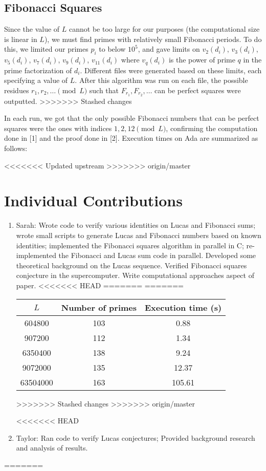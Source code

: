 \documentclass[11pt]{article}
\begin{document}
\subsection{Fibonacci Squares}
Since the value of $L$ cannot be too large for our purposes (the computational size is linear in $L$), we must find primes with relatively small Fibonacci periods. To do this, we limited our primes $p_i$ to below $10^5$, and gave limits on $v_2(d_i)$, $v_3(d_i)$, $v_5(d_i)$, $v_7(d_i)$, $v_9(d_i)$, $v_{11}(d_i)$ where $v_q(d_i)$ is the power of prime $q$ in the prime factorization of $d_i$. Different files were generated based on these limits, each specifying a value of $L$. After this algorithm was run on each file, the possible residues $r_1, r_2, \dots \pmod L$ such that $F_{r_1}, F_{r_2}, \dots$ can be perfect squares were outputted.
>>>>>>> Stashed changes

In each run, we got that the only possible Fibonacci numbers that can be perfect squares were the ones with indices $1, 2, 12 \pmod{L}$, confirming the computation done in [1] and the proof done in [2]. Execution times on Ada are summarized as follows:

<<<<<<< Updated upstream
>>>>>>> origin/master
\section{Individual Contributions}

\begin{enumerate}
\item Sarah: Wrote code to verify various identities on Lucas and Fibonacci sums; wrote small scripts to generate Lucas and Fibonacci numbers based on known identities; implemented the Fibonacci squares algorithm in parallel in C; re-implemented the Fibonacci and Lucas sum code in parallel. Developed some theoretical background on the Lucas sequence. Verified Fibonacci squares conjecture in the supercomputer. Write computational approaches aspect of paper.
<<<<<<< HEAD
=======
=======
\begin{tabular}{ccc}
\hline
$L$ & Number of primes & Execution time (s) \\ \hline
604800 & 103 & 0.88 \\
907200 & 112 & 1.34 \\
6350400 & 138 & 9.24 \\
9072000 & 135 & 12.37 \\
63504000 & 163 & 105.61 \\ \hline \hline
\end{tabular}
>>>>>>> Stashed changes
>>>>>>> origin/master


<<<<<<< HEAD
\item Taylor: Ran code to verify Lucas conjectures; Provided background research and analysis of results. 
\end{enumerate}
=======
\end{document}
